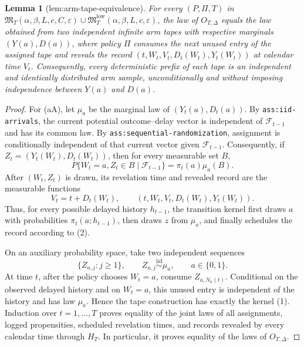 \documentclass{article}
\newtheorem{lemma}{Lemma}
\begin{document}
\begin{lemma}[lem:arm-tape-equivalence]\label{lem:arm-tape-equivalence}
For every \((P,\Pi,T)\) in \(\mathfrak M_T(\alpha,\beta,L,c,C,\varepsilon)\cup\mathfrak M_T^{\mathrm{low}}(\alpha,\beta,L,c,\varepsilon)\), the law of \(O_{T,\Delta}\) equals the law obtained from two independent infinite arm tapes with respective marginals \((Y(a),D(a))\), where policy \(\Pi\) consumes the next unused entry of the assigned tape and reveals the record \((t,W_t,V_t,D_t(W_t),Y_t(W_t))\) at calendar time \(V_t\). Consequently, every deterministic prefix of each tape is an independent and identically distributed arm sample, unconditionally and without imposing independence between \(Y(a)\) and \(D(a)\).
\end{lemma}
\begin{proof}
For (a\in\mathcal A), let \(\mu_a\) be the marginal law of \((Y_t(a),D_t(a))\).  By \texttt{ass:iid-arrivals}, the current potential outcome--delay vector is independent of \(\mathcal F_{t-1}\) and has its common law.  By \texttt{ass:sequential-randomization}, assignment is conditionally independent of that current vector given \(\mathcal F_{t-1}\).  Consequently, if \(Z_t=(Y_t(W_t),D_t(W_t))\), then for every measurable set \(B\),
\[
 P\{W_t=a,Z_t\in B\mid\mathcal F_{t-1}\}
 =\pi_t(a)\mu_a(B).                                                    \tag{1}
\]
After \((W_t,Z_t)\) is drawn, its revelation time and revealed record are the measurable functions
\[
 V_t=t+D_t(W_t),\qquad
 (t,W_t,V_t,D_t(W_t),Y_t(W_t)).                                         \tag{2}
\]
Thus, for every possible delayed history \(h_{t-1}\), the transition kernel first draws \(a\) with probabilities \(\pi_t(a;h_{t-1})\), then draws \(z\) from \(\mu_a\), and finally schedules the record according to (2).

On an auxiliary probability space, take two independent sequences
\[
 \{Z_{a,j}:j\geq1\},\qquad Z_{a,j}\stackrel{\mathrm{iid}}{\sim}\mu_a,
 \qquad a\in\{0,1\}.                                                     \tag{3}
\]
At time \(t\), after the policy chooses \(W_t=a\), consume \(Z_{a,N_a(t)}\).  Conditional on the observed delayed history and on \(W_t=a\), this unused entry is independent of the history and has law \(\mu_a\).  Hence the tape construction has exactly the kernel (1).  Induction over \(t=1,\ldots,T\) proves equality of the joint laws of all assignments, logged propensities, scheduled revelation times, and records revealed by every calendar time through \(H_T\).  In particular, it proves equality of the laws of \(O_{T,\Delta}\).


\end{proof}
\end{document}
